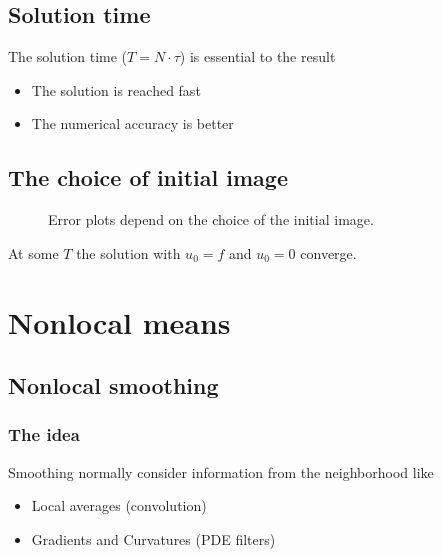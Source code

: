 \documentclass[letterpaper,10pt,english]{sphinxmanual}
\begin{document}
\section{Solution time}
\label{\detokenize{02-ImageEnhancement:solution-time}}
\sphinxAtStartPar
The solution time (\(T=N\cdot\tau\)) is essential to the result
\begin{itemize}
\item {} 
\sphinxAtStartPar
{} The solution is reached fast

\item {} 
\sphinxAtStartPar
{} The numerical accuracy is better

\end{itemize}


\section{The choice of initial image}
\label{\detokenize{02-ImageEnhancement:the-choice-of-initial-image}}
\begin{figure}[htbp]
\centering
\capstart

\noindent{}
\caption{Error plots depend on the choice of the initial image.}\label{\detokenize{02-ImageEnhancement:id28}}\end{figure}



\sphinxAtStartPar
At some \(T\) the solution with \(u_0=f\) and \(u_0=0\) converge.


\chapter{Non\sphinxhyphen{}local means}
\label{\detokenize{02-ImageEnhancement:non-local-means}}

\section{Non\sphinxhyphen{}local smoothing}
\label{\detokenize{02-ImageEnhancement:non-local-smoothing}}

\subsection{The idea}
\label{\detokenize{02-ImageEnhancement:id2}}
\sphinxAtStartPar
Smoothing normally consider information from the neighborhood like
\begin{itemize}
\item {} 
\sphinxAtStartPar
Local averages (convolution)

\item {} 
\sphinxAtStartPar
Gradients and Curvatures (PDE filters)

\end{itemize}
\end{document}
